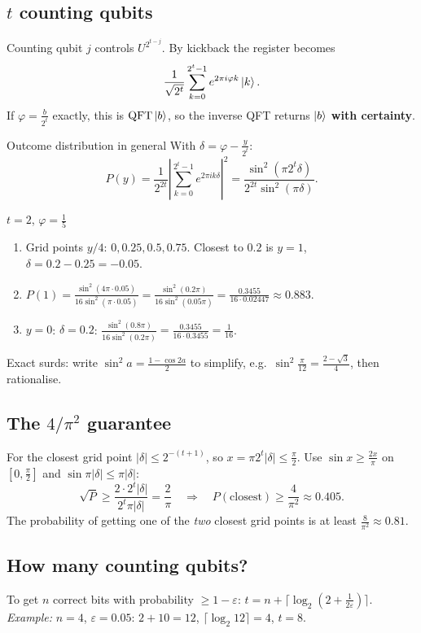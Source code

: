 \documentclass[11pt,a4paper,openany]{book}
\newcounter{wex}[chapter]
\newenvironment{steps}{\begin{enumerate}[label=\textbf{Step \arabic*.}, leftmargin=4.2em, itemsep=2pt]}{\end{enumerate}}
\newcommand{\QFT}{\mathrm{QFT}}
\begin{document}
\subsection{$t$ counting qubits}
Counting qubit $j$ controls $U^{2^{t-j}}$. By kickback the register becomes
\[ \frac{1}{\sqrt{2^t}}\sum_{k=0}^{2^t-1} e^{2\pi i\varphi k}\ket{k}. \]
If $\varphi = \frac{b}{2^t}$ exactly, this is $\QFT\ket b$, so the inverse QFT returns $\ket b$ \textbf{with certainty}.

\begin{keyres}{Outcome distribution in general}
With $\delta = \varphi - \frac{y}{2^t}$:
\[ P(y) = \frac{1}{2^{2t}}\left|\sum_{k=0}^{2^t-1}e^{2\pi i k\delta}\right|^2 = \frac{\sin^2(\pi 2^t\delta)}{2^{2t}\sin^2(\pi\delta)}. \]
\end{keyres}
\begin{wexample}{$t = 2$, $\varphi = \frac15$}
\begin{steps}
\item Grid points $y/4$: $0, 0.25, 0.5, 0.75$. Closest to $0.2$ is $y = 1$, $\delta = 0.2 - 0.25 = -0.05$.
\item $P(1) = \frac{\sin^2(4\pi\cdot0.05)}{16\sin^2(\pi\cdot0.05)} = \frac{\sin^2(0.2\pi)}{16\sin^2(0.05\pi)} = \frac{0.3455}{16\cdot0.02447} \approx 0.883$.
\item $y = 0$: $\delta = 0.2$: $\frac{\sin^2(0.8\pi)}{16\sin^2(0.2\pi)} = \frac{0.3455}{16\cdot0.3455} = \frac{1}{16}$.
\end{steps}
Exact surds: write $\sin^2 a = \frac{1 - \cos 2a}{2}$ to simplify, e.g.\ $\sin^2\frac{\pi}{12} = \frac{2 - \sqrt3}{4}$, then rationalise.
\end{wexample}

\subsection{The $4/\pi^2$ guarantee}
For the closest grid point $|\delta| \le 2^{-(t+1)}$, so $x = \pi2^t|\delta| \le \frac\pi2$. Use $\sin x \ge \frac{2x}{\pi}$ on $[0, \frac\pi2]$ and $\sin\pi|\delta| \le \pi|\delta|$:
\[ \sqrt{P} \ge \frac{2\cdot2^t|\delta|}{2^t\pi|\delta|} = \frac2\pi \quad\Rightarrow\quad P(\text{closest}) \ge \frac{4}{\pi^2} \approx 0.405. \]
The probability of getting one of the \emph{two} closest grid points is at least $\frac{8}{\pi^2} \approx 0.81$.

\subsection{How many counting qubits?}
To get $n$ correct bits with probability $\ge 1 - \varepsilon$: $t = n + \lceil\log_2(2 + \frac{1}{2\varepsilon})\rceil$.
\emph{Example:} $n = 4$, $\varepsilon = 0.05$: $2 + 10 = 12$, $\lceil\log_2 12\rceil = 4$, $t = 8$.
\end{document}
